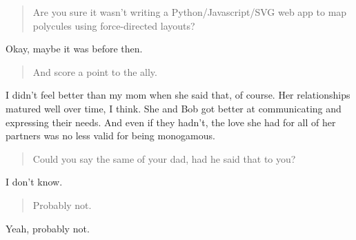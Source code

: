 \begin{quote}
Are you sure it wasn't writing a Python/Javascript/SVG web app to map polycules using force-directed layouts?
\end{quote}

Okay, maybe it was before then.

\begin{quote}
And score a point to the ally.
\end{quote}

I didn't feel better than my mom when she said that, of course. Her relationships matured well over time, I think. She and Bob got better at communicating and expressing their needs. And even if they hadn't, the love she had for all of her partners was no less valid for being monogamous.

\begin{quote}
Could you say the same of your dad, had he said that to you?
\end{quote}

I don't know.

\begin{quote}
Probably not.
\end{quote}

Yeah, probably not.
